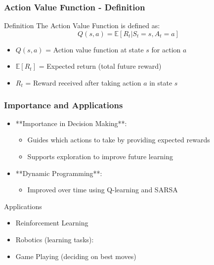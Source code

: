 \documentclass[aspectratio=169]{beamer}
\begin{document}
\begin{frame}[fragile]
    \frametitle{Action Value Function - Definition}
    \begin{block}{Definition}
        The Action Value Function is defined as:
        \begin{equation}
            Q(s, a) = \mathbb{E}[R_t | S_t = s, A_t = a]
        \end{equation}
    \end{block}
    \begin{itemize}
        \item \( Q(s, a) \) = Action value function at state \( s \) for action \( a \)
        \item \( \mathbb{E}[R_t] \) = Expected return (total future reward)
        \item \( R_t \) = Reward received after taking action \( a \) in state \( s \)
    \end{itemize}
\end{frame}

\begin{frame}[fragile]
    \frametitle{Importance and Applications}
    \begin{itemize}
        \item **Importance in Decision Making**:
        \begin{itemize}
            \item Guides which actions to take by providing expected rewards
            \item Supports exploration to improve future learning
        \end{itemize}
        \item **Dynamic Programming**:
        \begin{itemize}
            \item Improved over time using Q-learning and SARSA
        \end{itemize}
    \end{itemize}
    \begin{block}{Applications}
        \begin{itemize}
            \item Reinforcement Learning
            \item Robotics (learning tasks):
            \item Game Playing (deciding on best moves)
        \end{itemize}
    \end{block}
\end{frame}
\end{document}
